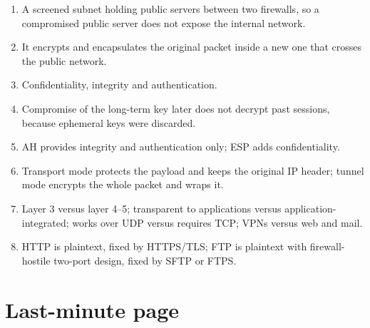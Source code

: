 \documentclass[11pt,a4paper]{article}
\begin{document}
\begin{enumerate}
\item A screened subnet holding public servers between two firewalls, so a compromised public server does not expose the internal network.
\item It encrypts and encapsulates the original packet inside a new one that crosses the public network.
\item Confidentiality, integrity and authentication.
\item Compromise of the long-term key later does not decrypt past sessions, because ephemeral keys were discarded.
\item AH provides integrity and authentication only; ESP adds confidentiality.
\item Transport mode protects the payload and keeps the original IP header; tunnel mode encrypts the whole packet and wraps it.
\item Layer 3 versus layer 4--5; transparent to applications versus application-integrated; works over UDP versus requires TCP; VPNs versus web and mail.
\item HTTP is plaintext, fixed by HTTPS/TLS; FTP is plaintext with firewall-hostile two-port design, fixed by SFTP or FTPS.
\end{enumerate}

\section{Last-minute page}
\end{document}
